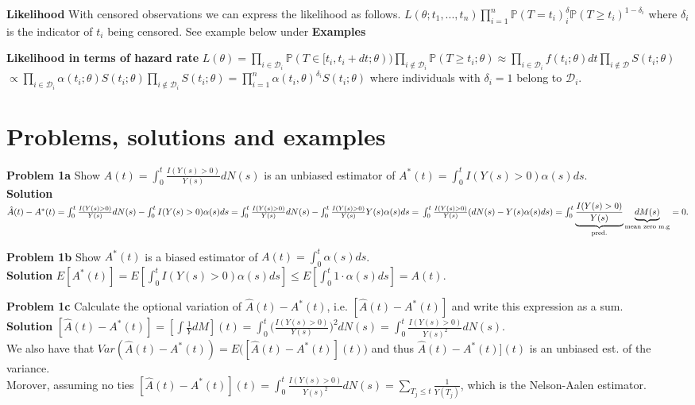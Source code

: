 \documentclass{article}
\begin{document}
\medskip

\textbf{Likelihood} With censored observations we can express the likelihood as follows. $L(\theta; t_1,...,t_n)\prod_{i=1}^n \mathbb{P}(T = t_i)^\delta_i \mathbb{P}(T \geq t_i)^{1-\delta_i}$ where $\delta_i$ is the indicator of $t_i$ being censored. See example below under \textbf{Examples}

\medskip

\textbf{Likelihood in terms of hazard rate} $L(\theta) = \prod_{i\in \mathcal{D}_i}\mathbb{P}(T\in[t_i, t_i +dt;\theta))\prod_{i\notin \mathcal{D}_i}\mathbb{P}(T\geq t_i; \theta) \approx \prod_{i \in \mathcal{D}_i} f(t_i;\theta)dt\prod_{i \notin \mathcal{D}} S(t_i; \theta)$ \newline $\propto \prod_{i\in \mathcal{D}_i}\alpha(t_i;\theta)S(t_i;\theta)\prod_{i\notin \mathcal{D}_i}S(t_i;\theta) = \prod_{i=1}^n \alpha(t_i,\theta)^{\delta_i}S(t_i;\theta)$ where individuals with $\delta_i = 1$ belong to $\mathcal{D}_i$.

\medskip

\section*{Problems, solutions and examples} 

\textbf{Problem 1a} Show $\hat{A}(t) = \int_0^t \frac{I(Y(s)>0)}{Y(s)} dN(s)$ is an unbiased estimator of $A^*(t) = \int_0^t I(Y(s)>0)\alpha(s)ds$. \\
\textbf{Solution} $\hat{A}(t) - A^*(t)= \int_0^t \frac{I(Y(s)>0)}{Y(s)} dN(s) - \int_0^t I(Y(s)>0)\alpha(s)ds = \int_0^t \frac{I(Y(s)>0)}{Y(s)} dN(s) - \int_0^t \frac{I(Y(s)>0)}{Y(s)} Y(s)\alpha(s)ds = \\
\int_0^t \frac{I(Y(s)>0)}{Y(s)} (dN(s) - Y(s)\alpha(s)ds) =
\int_0^t \underbrace{\frac{I(Y(s)>0)}{Y(s)}}_{\text{pred.}} \underbrace{dM(s)}_{\text{mean zero m.g}} = 0.
$ 

\medskip

\textbf{Problem 1b} Show $A^*(t)$ is a biased estimator of $A(t) = \int_0^t\alpha(s)ds$. \\
\textbf{Solution} $E[A^*(t)] = E[\int_0^t I(Y(s)>0)\alpha(s)ds] \leq 
E[\int_0^t 1\cdot \alpha(s)ds] = A(t)$. 

\medskip

\textbf{Problem 1c} Calculate the optional variation of $\hat{A}(t)−A^*(t)$, i.e. $[\hat{A}(t)−A^*(t)]$ and write this expression as a sum. \\
\textbf{Solution} $[\hat{A}(t)−A^*(t)] = [\int \frac{1}{Y}dM](t) = \int_0^t \Big(\frac{I(Y(s)>0)}{Y(s)}\Big)^2 dN(s) = \int_0^t\frac{I(Y(s)>0)}{Y(s)^2} dN(s)$. \\ 
We also have that $Var( \hat{A}(t) - A^*(t)) = E\Big( [\hat{A}(t) - A^*(t)](t) \Big)$ and thus $\hat{A}(t) - A^*(t)](t)$ is an unbiased est. of the variance. \\ Morover, assuming no ties $[\hat{A}(t) - A^*(t)](t) = \int_0^t\frac{I(Y(s)>0)}{Y(s)^2} dN(s) = \sum_{T_j\leq t} \frac{1}{Y(T_j)}$, which is the Nelson-Aalen estimator.
\end{document}
